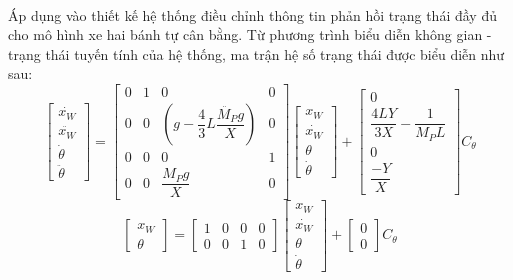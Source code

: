 \paragraph{}Áp dụng vào thiết kế hệ thống điều chỉnh thông tin phản hồi trạng thái đầy đủ cho mô hình xe hai bánh tự cân bằng. Từ phương trình biểu diễn không gian - trạng thái tuyến tính của hệ thống, ma trận hệ số trạng thái được biểu diễn như sau: 
\begin{equation}
\begin{bmatrix}
\dot{x_{W}}\\
\ddot{x_{W}}\\
\dot{\theta}\\
\ddot{\theta}
\end{bmatrix}
=
\begin{bmatrix}
0&1&0&0\\
0&0&(g-\dfrac{4}{3}L\dfrac{\ddot{M_{P}}g}{X}) &0\\
0&0&0&1\\
0&0&\dfrac{M_{P}g}{X}&0
\end{bmatrix}
\begin{bmatrix}
x_{W}\\
\dot{x_{W}}\\
\theta\\
\dot{\theta}
\end{bmatrix}
+
\begin{bmatrix}
0\\
\dfrac{4LY}{3X} - \dfrac{1}{M_{P}L}\\
0\\
\dfrac{-Y}{X}
\end{bmatrix}
C_{\theta}
\end{equation}
\begin{equation}
\begin{bmatrix}
x_{W}\\
\theta
\end{bmatrix}
= 
\begin{bmatrix}
1&0&0&0\\
0&0&1&0
\end{bmatrix}
\begin{bmatrix}
x_{W}\\
\dot{x_{W}}\\
\theta\\
\dot{\theta}
\end{bmatrix}
+
\begin{bmatrix}
0\\
0
\end{bmatrix}
C_{\theta}
\end{equation}
